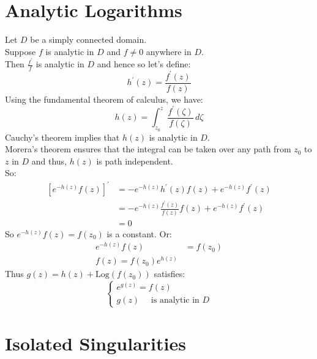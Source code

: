 \section{Analytic Logarithms}

\begin{lemma}
    Let $D$ be a simply connected domain. \\
    Suppose $f$ is analytic in $D$ and $f \neq 0$ anywhere in $D$. \\
    Then $\frac{f^{\prime}}{f}$ is analytic in $D$ and hence so let's define:
    \begin{equation*}
        h^{\prime}(z) = \frac{f^{\prime}(z)}{f(z)}
    \end{equation*}
    Using the fundamental theorem of calculus, we have:
    \begin{equation*}
        h(z) = \int_{z_0}^{z} \frac{f^{\prime}(\zeta)}{f(\zeta)} \, d\zeta
    \end{equation*}
    Cauchy's theorem implies that $h(z)$ is analytic in $D$. \\
    Morera's theorem ensures that the integral can be taken over any path from $z_0$ to $z$ in $D$ and thus, $h(z)$ is path independent. \\
    So:
    \begin{align*}
        \left[e^{-h(z)}f(z)\right]^{\prime} & = -e^{-h(z)}h^{\prime}(z)f(z) + e^{-h(z)}f^{\prime}(z)              \\
                                            & = -e^{-h(z)}\frac{f^{\prime}(z)}{f(z)}f(z) + e^{-h(z)}f^{\prime}(z) \\
                                            & = 0
    \end{align*}
    So $e^{-h(z)}f(z) = f(z_0)$ is a constant. Or:
    \begin{align*}
        e^{-h(z)}f(z) & = f(z_0) \\
        f(z) = f(z_0)e^{h(z)}
    \end{align*}
    Thus $g (z) = h(z) + \text{Log}(f(z_0))$ satisfies:
    \begin{equation*}
        \begin{cases}
            e^{g(z)} = f(z) \\
            g(z) \quad \text{ is analytic in } D
        \end{cases}
    \end{equation*}
\end{lemma}

\section{Isolated Singularities}

